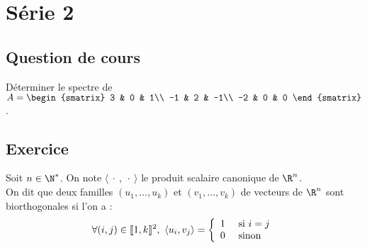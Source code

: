 \documentclass[11pt]{article}%
\begin{document}
\newpage

\section*{Série 2}
\subsection*{Question de cours}
\noindent
Déterminer le spectre de $A=
\begin{smatrix}
 3 & 0 & 1\\
 -1 & 2 & -1\\
 -2 & 0 & 0
\end{smatrix}$.

\subsection*{Exercice} %
\noindent
Soit $n\in\N^*$. On note $\langle \ \cdot \ , \ \cdot \ \rangle$ le 
produit scalaire canonique de $\R^n$.\\
On dit que deux familles $(u_1, \ldots, u_k)$ et $(v_1,\ldots, v_k)$ de 
vecteurs de $\R^n$ sont biorthogonales si l'on a :
\[
 \forall (i,j)\in \llbracket 1,k\rrbracket^2, \ \langle u_i,v_j\rangle =\left\{
 \begin{array}{ll}
  1 & \mbox{ si $i=j$}\\
  0 & \mbox{ sinon}
 \end{array}
 \right.
\]
\end{document}
